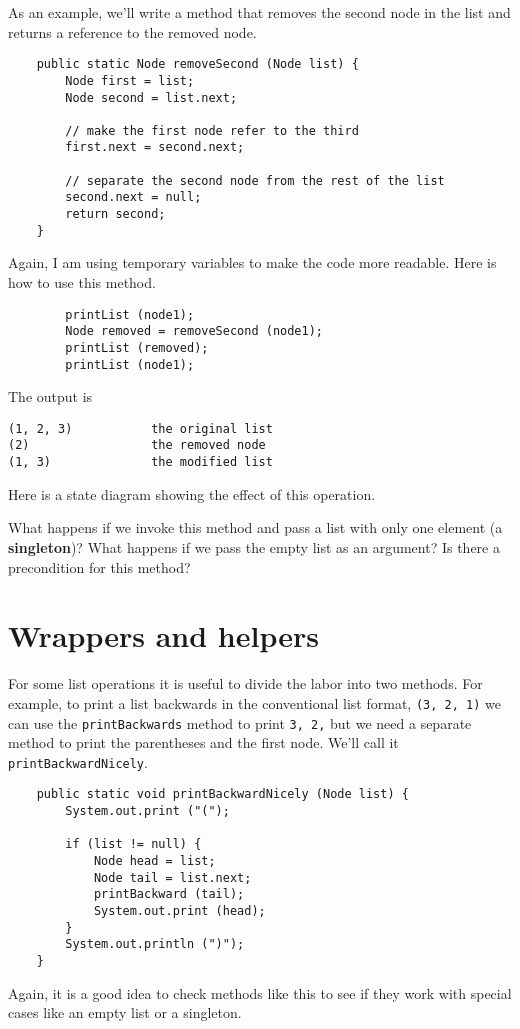 As an example, we'll write a method that removes the second
node in the list and returns a reference to the removed node.

\begin{verbatim}
    public static Node removeSecond (Node list) {
        Node first = list;
        Node second = list.next;

        // make the first node refer to the third
        first.next = second.next;

        // separate the second node from the rest of the list
        second.next = null;
        return second;
    }
\end{verbatim}
%
Again, I am using temporary variables to make the code more
readable.  Here is how to use this method.

\begin{verbatim}
        printList (node1);
        Node removed = removeSecond (node1);
        printList (removed);
        printList (node1);
\end{verbatim}
%
The output is

\begin{verbatim}
(1, 2, 3)           the original list
(2)                 the removed node
(1, 3)              the modified list
\end{verbatim}
%
Here is a state diagram showing the effect of this operation.


What happens if we invoke this method and pass a list with only one
element (a {\bf singleton})?  What happens if we pass the empty list
as an argument?  Is there a precondition for this method?



\section{Wrappers and helpers}
\label{wrapper}

For some list operations it is useful to divide the labor into
two methods.  For example, to print a list backwards in the
conventional list format, {\tt (3, 2, 1)} we can use the
{\tt printBackwards} method to print {\tt 3, 2,} but we need
a separate method to print the parentheses and the first node.
We'll call it {\tt printBackwardNicely}.

\begin{verbatim}
    public static void printBackwardNicely (Node list) {
        System.out.print ("(");

        if (list != null) {
            Node head = list;
            Node tail = list.next;
            printBackward (tail);
            System.out.print (head);
        }
        System.out.println (")");
    }	
\end{verbatim}
%
Again, it is a good idea to check methods like this to see
if they work with special cases like an empty list or
a singleton.

